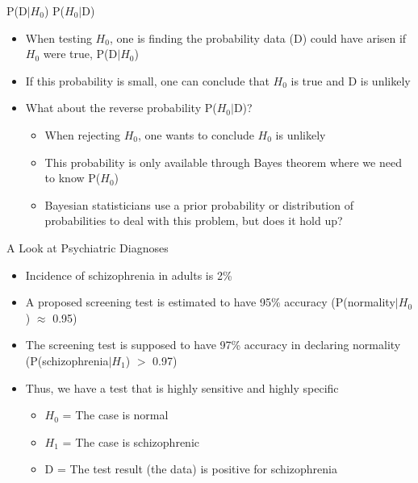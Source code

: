 \documentclass[aspectratio=169, 12pt]{beamer}
\begin{document}
\begin{frame}{P(D$|$$H_0$) \neq P($H_0$$|$D)}
  \begin{itemize}
  \item When testing $H_0$, one is finding the probability data (D) could have arisen if $H_0$ were true, P(D$|$$H_0$)
  \item If this probability is small, one can conclude that $H_0$ is true and D is unlikely
  \item What about the reverse probability P($H_0$$|$D)? %
    \begin{itemize}
    \item When rejecting $H_0$, one wants to conclude $H_0$ is unlikely
    \item This probability is only available through Bayes theorem where we need to know P($H_0$)
    \item Bayesian statisticians use a prior probability or distribution of probabilities to deal with this problem, but does it hold up?
    \end{itemize}
  \end{itemize}
\end{frame}

\begin{frame}{A Look at Psychiatric Diagnoses}
  \begin{itemize}
  \item Incidence of schizophrenia in adults is 2\%\
  \item A proposed screening test is estimated to have 95\% accuracy (P(normality$|$$H_0$) \(\approx\) 0.95)
  \item The screening test is supposed to have 97\% accuracy in declaring normality (P(schizophrenia$|$$H_1$) \(>\) 0.97)
  \item Thus, we have a test that is highly sensitive and highly specific
    \begin{itemize}
    \item $H_0$ = The case is normal
    \item $H_1$ = The case is schizophrenic
    \item D = The test result (the data) is positive for schizophrenia
    \end{itemize}
  \end{itemize}
\end{frame}
\end{document}
